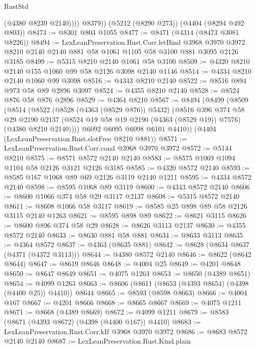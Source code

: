 \begin{lexlean}{RustStd}
\begin{coremodule}
{\begin{coremodule}
{{{{{{{{{{{{{{{{              (@4380 @8239 @2140))))
        @8379))
    (@5212 (@8290 @273))
    (@4404 (@8294 @492 @803))
@8473 := @8301 @803 @1055
@8477 := @8471 (@4314 (@8473 @3081 @8226))
@8494 := LexLeanPreservation.Rust.Corr.letBind
    @3968
    @3970
    @3972
    @8210
    @2140
    @2140
    @881
    @58
    @1061
    @1105
    @58
    @3100
    @881
    @3095
    @2126
    @3185
@8499 := @5315 @8210 @2140 @1061 @58 @3100
@8509 := @4320 @8210 @2140 @155 @1060 @99 @58 @2126 @3098 @2140 @1146
@8514 := @4334 @8210 @2140 @1060 @99 @3098
@8516 := @4343 @8210 @2140
@8522 := @8516 @894 @973 @58 @89 @2896 @3097
@8524 := @4355 @8210 @2140
@8528 := @8524 @876 @58 @876 @2896
@8529 := @4364 @8210
@8567 := @8494
    (@8499
      (@8509
        (@8514
          (@8522
            (@8528 (@4363 (@8529 @876)) @5432)
            (@8516
              @396
              @374
              @58
              @29
              @2190
              @2137
              (@8524 @19 @58 @19 @2190 (@4363 (@8529 @19)) @7576)
              (@4380 @8210 @2140))))
        @6092
        @6095
        @6098
        @6101
        @4410))
    (@4404 (LexLeanPreservation.Rust.slotFree @8210 @881))
@8571 := LexLeanPreservation.Rust.Corr.cond @3968 @3970 @3972
@8572 := @5144 @8210
@8575 := @8571 @8572 @2140 @2140
@8583 := @8575 @1069 @1094 @1104 @58 @2126 @3121 @2126 @3185
@8585 := @4320 @8572 @2140
@8593 := @8585 @167 @1068 @89 @69 @2126 @3119 @2140 @1211
@8595 := @4334 @8572 @2140
@8598 := @8595 @1068 @89 @3119
@8600 := @4343 @8572 @2140
@8606 := @8600 @1066 @374 @58 @29 @3117 @2137
@8608 := @5315 @8572 @2140
@8611 := @8608 @1066 @58 @3117
@8619 := @8585 @25 @898 @89 @58 @2126 @3115 @2140 @1263
@8621 := @8595 @898 @89
@8622 := @8621 @3115
@8626 := @8600 @896 @374 @58 @29
@8628 := @8626 @3113 @2137
@8630 := @4355 @8572 @2140
@8633 := @8630 @881 @58 @881
@8634 := @8633 @3113
@8635 := @4364 @8572
@8637 := @4363 (@8635 @881)
@8642 := @8628 (@8634 @8637 (@4371 (@4372 @3113)))
@8644 := @4380 @8572 @2140
@8646 := @8622 (@8642 @8644)
@8647 := @8619 @8646
@8648 := @4004 @25
@8649 := @4201 @8648
@8650 := @8647 @8649
@8651 := @4075 @1263
@8653 := @8650 (@4389 @8651)
@8654 := @4099 @1263
@8663 := @8606 (@8611 (@8653 (@4393 @8654) (@4398 (@4400 @25)) @4410)) @8644
@8665 := @8593 (@8598 @8663)
@8666 := @4004 @167
@8667 := @4201 @8666
@8668 := @8665 @8667
@8669 := @4075 @1211
@8671 := @8668 (@4389 @8669)
@8672 := @4099 @1211
@8679 := @8583 (@8671 (@4393 @8672) (@4398 (@4400 @167)) @4410)
@8683 := LexLeanPreservation.Rust.Corr.kIf @3968 @3970 @3972
@8686 := @8683 @8572 @2140 @2140
@8687 := LexLeanPreservation.Rust.Kind.plain
}}}}}}}}}}}}}}}}
\end{coremodule}}
\end{coremodule}
\end{lexlean}
